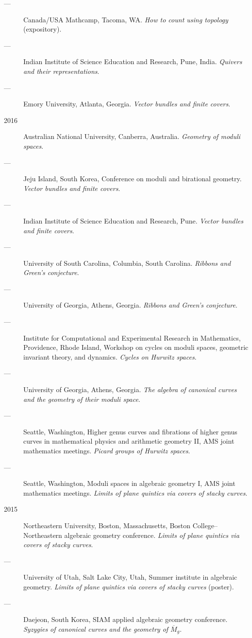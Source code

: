 \documentclass[11pt]{article}
\begin{document}
\begin{description}
\item[{---}] Canada/USA Mathcamp, Tacoma, WA. \emph{How to count using topology} (expository).
\item[{---}] Indian Institute of Science Education and Research, Pune, India. \emph{Quivers and their representations}.
\item[{---}] Emory University, Atlanta, Georgia. \emph{Vector bundles and finite covers}.
\item[{2016}] Australian National University, Canberra, Australia. \emph{Geometry of moduli spaces}.
\item[{---}] Jeju Island, South Korea, Conference on moduli and birational geometry. \emph{Vector bundles and finite covers}.
\item[{---}] Indian Institute of Science Education and Research, Pune. \emph{Vector bundles and finite covers}.
\item[{---}] University of South Carolina, Columbia, South Carolina. \emph{Ribbons and Green's conjecture}.
\item[{---}] University of Georgia, Athens, Georgia. \emph{Ribbons and Green's conjecture}.
\item[{---}] Institute for Computational and Experimental Research in Mathematics, Providence, Rhode Island, Workshop on cycles on moduli spaces, geometric invariant theory, and dynamics. \emph{Cycles on Hurwitz spaces}.
\item[{---}] University of Georgia, Athens, Georgia. \emph{The algebra of canonical curves and the geometry of their moduli space}.
\item[{---}] Seattle, Washington, Higher genus curves and fibrations of higher genus curves in mathematical physics and arithmetic geometry II, AMS joint mathematics meetings. \emph{Picard groups of Hurwitz spaces}.
\item[{---}] Seattle, Washington, Moduli spaces in algebraic geometry I, AMS joint mathematics meetings. \emph{Limits of plane quintics via covers of stacky curves}.
\item[{2015}] Northeastern University, Boston, Massachusetts, Boston College--Northeastern algebraic geometry conference. \emph{Limits of plane quintics via covers of stacky curves}.
\item[{---}] University of Utah, Salt Lake City, Utah, Summer institute in algebraic geometry. \emph{Limits of plane quintics via covers of stacky curves} (poster).
\item[{---}] Daejeon, South Korea, SIAM applied algebraic geometry conference. \emph{Syzygies of canonical curves and the geometry of \(\overline M_g\)}.

\end{description}
\end{document}
